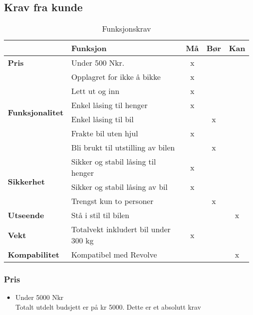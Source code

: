 \subsection{Krav fra kunde}
\begin{table}[H]
\begin{tabular}{|l|l|c|c|c|}
\hline
 & \textbf{Funksjon} & \textbf{Må} & \textbf{Bør} & \textbf{Kan} \\ \hline
\textbf{Pris} & Under 500 Nkr. & x & & \\
\hline
\multirow{6}{*}{\textbf{Funksjonalitet}} 
 & Opplagret for ikke å bikke & x & & \\
 & Lett ut og inn & x & & \\
 & Enkel låsing til henger & x & & \\
 & Enkel låsing til bil & & x & \\
 & Frakte bil uten hjul & x & & \\
 & Bli brukt til utstilling av bilen & & x & \\
\hline
\multirow{3}{*}{\textbf{Sikkerhet}}
 & Sikker og stabil låsing til henger & x & & \\
 & Sikker og stabil låsing av bil & x & & \\
 & Trengst kun to personer & & x & \\
\hline
\textbf{Utseende} & Stå i stil til bilen & &  & x \\ \hline
\textbf{Vekt} & Totalvekt inkludert bil under 300 kg & x & & \\ \hline
\textbf{Kompabilitet} & Kompatibel med Revolve & & & x \\ \hline
\end{tabular}
\caption{Funksjonskrav}
\end{table}


\subsubsection{Pris}
\begin{itemize}
\item Under 5000 Nkr \\
Totalt utdelt budsjett er på kr 5000. Dette er et absolutt krav
\end{itemize}

